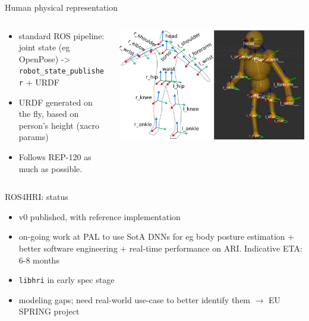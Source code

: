 \documentclass[xcolor=table]{beamer}
\begin{document}
\begin{frame}{Human physical representation}

    \begin{columns}
        \begin{column}{0.4\linewidth}
            \begin{itemize}
                \item standard ROS pipeline: joint state (eg OpenPose) -> \texttt{robot\_state\_publisher} + URDF

                \item URDF generated on the fly, based on person’s height (xacro params)

                \item Follows REP-120 as much as possible.
            \end{itemize}
        \end{column}
        \begin{column}{0.6\linewidth}
            \begin{center}
                \includegraphics[width=\linewidth]{ros4hri/skeletons}
            \end{center}
        \end{column}
    \end{columns}
\end{frame}


\begin{frame}{ROS4HRI: status}

    \begin{itemize}
        \item v0 published, with reference implementation
        \item on-going work at PAL to use SotA DNNs for eg body posture estimation + better software engineering + real-time performance on ARI. Indicative ETA: 6-8 months
        \item \texttt{libhri} in early spec stage
        \item modeling gaps; need real-world use-case to better identify them $\rightarrow$ EU SPRING project
    \end{itemize}
\end{frame}
\end{document}
